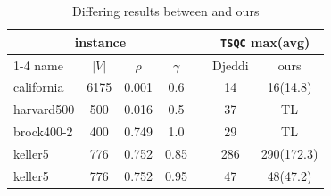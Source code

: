 \begin{table}[h!]
    \caption{Differing results between \cite{djeddi2019extension} and ours}
    \label{tab: differing results}
    \centering
    \begin{tabular}{l c c c c c c}
    \toprule
    \toprule
    \multicolumn{4}{c}{instance}  & & \multicolumn{2}{c}{\texttt{TSQC} max(avg)} \\
    \cmidrule{1-4} \cmidrule{6-7}
    name & $|V|$ & $\rho$ & $\gamma$ & & Djeddi & ours \\
    \midrule
california & 6175 & 0.001 & 0.6 & & 14 & 16(14.8) \\
harvard500 & 500 & 0.016 & 0.5 & & 37 & TL \\
brock400-2 & 400 & 0.749 & 1.0 & & 29 & TL \\
keller5 & 776 & 0.752 & 0.85 & & 286 & 290(172.3) \\
keller5 & 776 & 0.752 & 0.95 & & 47 & 48(47.2) \\

    \bottomrule
    \bottomrule
    \end{tabular}
\end{table}